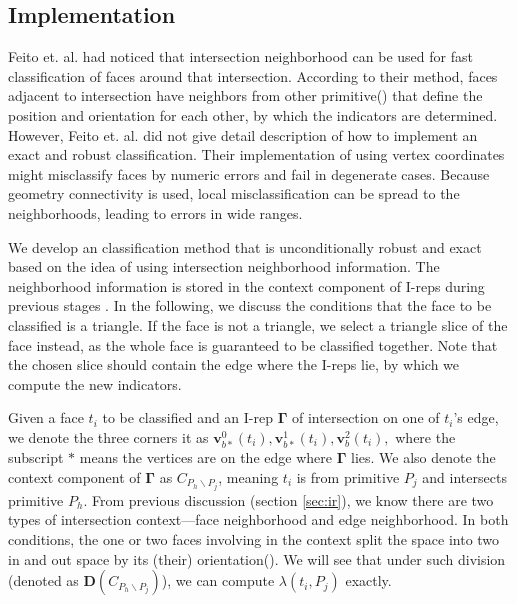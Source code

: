 \documentclass[10pt,journal,compsoc]{IEEEtran}
\begin{document}
\iffalse
\subsection{Implementation}

\label{sec:individual}

Feito et. al. \cite{feito2013fast} had noticed that intersection neighborhood can be used for fast classification of faces around that intersection. According to their method, faces adjacent to intersection have neighbors from other primitive() that define the position and orientation for each other, by which the indicators are determined. However, Feito et. al. did not give detail description of how to implement an exact and robust classification. Their implementation of using vertex coordinates might misclassify faces by numeric errors and fail in degenerate cases. Because geometry connectivity is used, local misclassification can be spread to the neighborhoods, leading to errors in wide ranges.

We develop an classification method that is unconditionally robust and exact based on the idea of using intersection neighborhood information. The neighborhood information is stored in the context component of I-reps during previous stages . In the following, we discuss the conditions that the face to be classified is a triangle. If the face is not a triangle, we select a triangle slice of the face instead, as the whole face is guaranteed to be classified together. Note that the chosen slice should contain the edge where the I-reps lie, by which we compute the new indicators.

Given a face $t_i$ to be classified and an I-rep $\boldsymbol\Gamma$ of intersection on one of $t_i$'s edge, we denote the three corners it as $\bm{v}_{b*}^{0}(t_i), \bm{v}_{b*}^{1}(t_i), \bm{v}_b^2(t_i),$ where the subscript $*$ means the vertices are on the edge where $\boldsymbol\Gamma$ lies. We also denote the context component of $\boldsymbol\Gamma$ as $C_{P_h \backslash P_j}$, meaning $t_i$ is from primitive $P_j$ and intersects primitive $P_h$. From previous discussion (section \ref{sec:ir}){\color{red}{may be more than one}}, we know there are two types of intersection context---face neighborhood and edge neighborhood. In both conditions, the one or two faces involving in the context split the space into two in and out space by its (their) orientation(). We will see that under such division (denoted as $\boldsymbol{D}(C_{P_h \backslash P_j})$), we can compute $\lambda(t_i, P_j)$ exactly.
\end{document}
